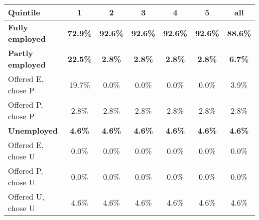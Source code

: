 \begin{center}
\begin{adjustbox}{width=\textwidth}
\begin{tabular}{lcccccc}\toprule
Quintile & 1 & 2 & 3 & 4 & 5 & all \\
\midrule
\textbf{Fully employed} & \textbf{72.9\%} & \textbf{92.6\%} & \textbf{92.6\%} & \textbf{92.6\%} & \textbf{92.6\%} & \textbf{88.6\%} \\
\textbf{Partly employed} & \textbf{22.5\%} & \textbf{2.8\%} & \textbf{2.8\%} & \textbf{2.8\%} & \textbf{2.8\%} & \textbf{6.7\%} \\
\;\;Offered E, chose P & 19.7\% & 0.0\% & 0.0\% & 0.0\% & 0.0\% & 3.9\% \\
\;\;Offered P, chose P & 2.8\% & 2.8\% & 2.8\% & 2.8\% & 2.8\% & 2.8\% \\
\textbf{Unemployed} & \textbf{4.6\%} & \textbf{4.6\%} & \textbf{4.6\%} & \textbf{4.6\%} & \textbf{4.6\%} & \textbf{4.6\%} \\
\;\;Offered E, chose U & 0.0\% & 0.0\% & 0.0\% & 0.0\% & 0.0\% & 0.0\% \\
\;\;Offered P, chose U & 0.0\% & 0.0\% & 0.0\% & 0.0\% & 0.0\% & 0.0\% \\
\;\;Offered U, chose U & 4.6\% & 4.6\% & 4.6\% & 4.6\% & 4.6\% & 4.6\% \\
\bottomrule\end{tabular}
\end{adjustbox}
\end{center}